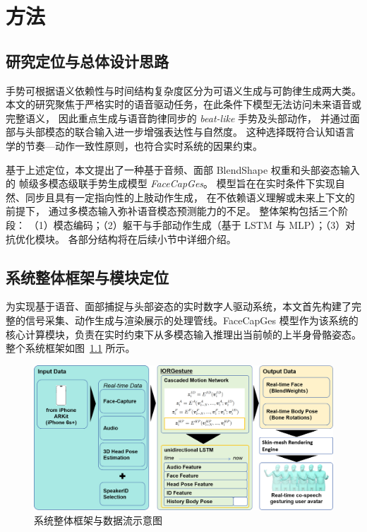 
\chapter{方法}

\section{研究定位与总体设计思路}
手势可根据语义依赖性与时间结构复杂度区分为可语义生成与可韵律生成两大类。
本文的研究聚焦于严格实时的语音驱动任务，在此条件下模型无法访问未来语音或完整语义，
因此重点生成与语音韵律同步的 \emph{beat-like} 手势及头部动作，
并通过面部与头部模态的联合输入进一步增强表达性与自然度。
这种选择既符合认知语言学的节奏—动作一致性原则，也符合实时系统的因果约束。

基于上述定位，本文提出了一种基于音频、面部 BlendShape 权重和头部姿态输入的
帧级多模态级联手势生成模型 \emph{FaceCapGes}。
模型旨在在实时条件下实现自然、同步且具有一定指向性的上肢动作生成，
在不依赖语义理解或未来上下文的前提下，
通过多模态输入弥补语音模态预测能力的不足。
整体架构包括三个阶段：
（1）模态编码；（2）躯干与手部动作生成（基于 LSTM 与 MLP）；（3）对抗优化模块。
各部分结构将在后续小节中详细介绍。

\section{系统整体框架与模块定位}

为实现基于语音、面部捕捉与头部姿态的实时数字人驱动系统，本文首先构建了完整的信号采集、动作生成与渲染展示的处理管线。FaceCapGes 模型作为该系统的核心计算模块，负责在实时约束下从多模态输入推理出当前帧的上半身骨骼姿态。整个系统框架如图~\ref{fig:overallFramework} 所示。

\begin{figure}[h!t]
\centering
\includegraphics[width=\textwidth]{figures/FigOverallFramework.png}
\caption{系统整体框架与数据流示意图}
\label{fig:overallFramework}
\end{figure}

